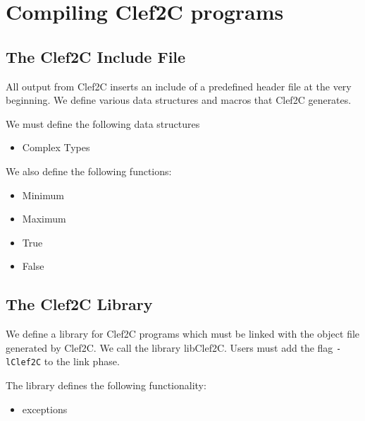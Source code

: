 
\section{Compiling Clef2C programs}


\subsection{The Clef2C Include File}
\label{header}

All output from Clef2C inserts an include of a predefined header file
at the very beginning.  We define various data structures and macros
that Clef2C generates.

We must define the following data structures
\begin{itemize}
\item Complex Types
\end{itemize}

We also define the following functions:
\begin{itemize}
\item Minimum
\item Maximum
\item True
\item False
\end{itemize}

\subsection{The Clef2C Library}
\label{clef2clib}

We define a library for Clef2C programs which must be linked with the
object file generated by Clef2C.  We call the library libClef2C.
Users must add the flag {\tt -lClef2C} to the link phase.

The library defines the following functionality:

\begin{itemize}
\item exceptions
\end{itemize}


